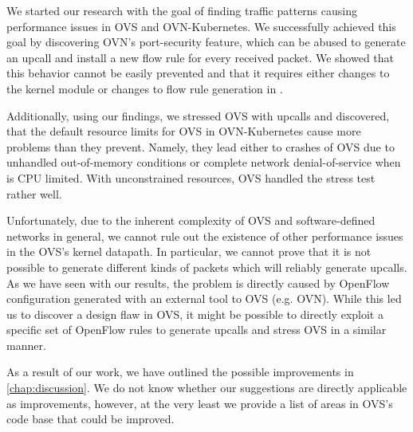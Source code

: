 

We started our research with the goal of finding traffic patterns causing performance issues in OVS and OVN-Kubernetes. We successfully achieved this goal by discovering OVN's port-security feature, which can be abused to generate an upcall and install a new flow rule for every received packet. We showed that this behavior cannot be easily prevented and that it requires either changes to the kernel module or changes to flow rule generation in .

Additionally, using our findings, we stressed OVS with upcalls and discovered, that the default resource limits for OVS in OVN-Kubernetes cause more problems than they prevent. Namely, they lead either to crashes of OVS due to unhandled out-of-memory conditions or complete network denial-of-service when  is CPU limited. With unconstrained resources, OVS handled the stress test rather well.

Unfortunately, due to the inherent complexity of OVS and software-defined networks in general, we cannot rule out the existence of other performance issues in the OVS's kernel datapath. In particular, we cannot prove that it is not possible to generate different kinds of packets which will reliably generate upcalls. As we have seen with our results, the problem is directly caused by OpenFlow configuration generated with an external tool to OVS (e.g. OVN). While this led us to discover a design flaw in OVS, it might be possible to directly exploit a specific set of OpenFlow rules to generate upcalls and stress OVS in a similar manner.

As a result of our work, we have outlined the possible improvements in \cref{chap:discussion}. We do not know whether our suggestions are directly applicable as improvements, however, at the very least we provide a list of areas in OVS's code base that could be improved.

